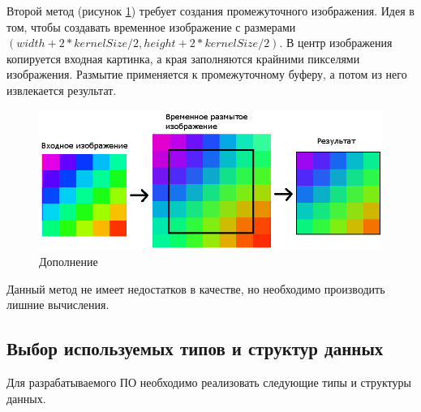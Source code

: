 Второй метод (рисунок \ref{fig:spire18}) требует создания промежуточного изображения. Идея в том, чтобы создавать временное изображение с размерами $(width + 2 * kernelSize / 2, height + 2 * kernelSize / 2)$. В центр изображения копируется входная картинка, а края заполняются крайними пикселями изображения. Размытие применяется к промежуточному буферу, а потом из него извлекается результат.

\begin{figure}[hbtp]
	\centering
	\includegraphics[width=\textwidth]{img/image10.png}
	\caption{\label{fig:spire18} Дополнение}
\end{figure}

Данный метод не имеет недостатков в качестве, но необходимо производить лишние вычисления.	

\subsection{Выбор используемых типов и структур данных}

Для разрабатываемого ПО необходимо реализовать следующие типы и
структуры данных.

